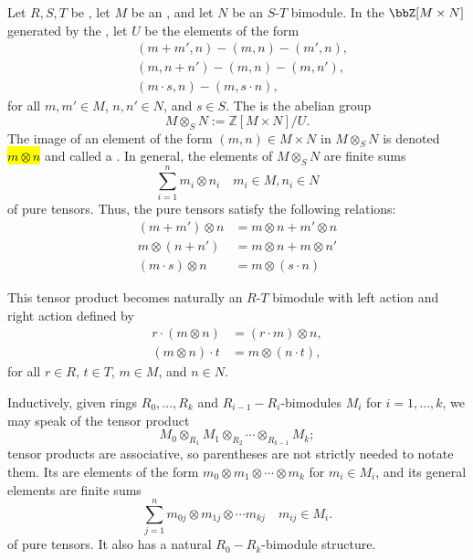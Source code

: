 \begin{definition} \label{definition:tensor_product_of_bimodules_of_rings}
Let $R,S,T$ be , let $M$ be an , and let $N$ be an $S$-$T$ bimodule. In the  $\bbZ[M \times N]$ generated by the , let $U$ be the  elements of the form
\begin{align*}
&(m+m',n) - (m,n) - (m',n),\\
&(m,n+n') - (m,n) - (m,n'),\\
&(m \cdot s, n) - (m, s \cdot n),
\end{align*}
for all $m,m' \in M$, $n,n' \in N$, and $s \in S$. The  is the  abelian group
$$M \otimes_S N := \mathbb{Z}[M \times N] / U.$$
The image of an element of the form $(m,n) \in M \times N$ in $M \otimes_S N$ is denoted \hl{$m \otimes n$} and called a . In general, the elements of $M \otimes_S N$ are finite sums 
$$\sum_{i=1}^n m_i \otimes n_i \quad m_i \in M, n_i \in N$$
of pure tensors. Thus, the pure tensors satisfy the following relations:
\begin{align*}
    (m + m') \otimes n &= m \otimes n + m' \otimes n \\ 
    m \otimes (n + n') &= m \otimes n + m \otimes n' \\
    (m \cdot s) \otimes n &= m \otimes (s \cdot n)
\end{align*}

This tensor product becomes naturally an $R$-$T$ bimodule with left action and right action defined by
\begin{align*}
r \cdot (m \otimes n) &= (r \cdot m) \otimes n, \\
(m \otimes n) \cdot t &= m \otimes (n \cdot t),
\end{align*}
for all $r \in R$, $t \in T$, $m \in M$, and $n \in N$.

Inductively, given rings $R_0,\ldots,R_k$ and $R_{i-1}-R_i$-bimodules $M_i$ for $i = 1,\ldots,k$, we may speak of the tensor product
$$M_0 \otimes_{R_1} M_1 \otimes_{R_2} \cdots \otimes_{R_{k-1}} M_k;$$
tensor products are associative\TODO{}, so parentheses are not strictly needed to notate them. Its  are elements of the form $m_0 \otimes m_1 \otimes \cdots \otimes m_k$ for $m_i \in M_i$, and its general elements are finite sums
$$\sum_{j=1}^n m_{0j} \otimes m_{1j} \otimes \cdots m_{kj} \quad m_{ij} \in M_i.$$
of pure tensors. It also has a natural $R_0-R_k$-bimodule structure.


\end{definition}
